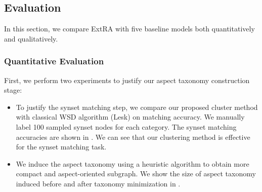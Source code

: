 \subsection{Evaluation}
\label{sec:endeval}
In this section, we compare ExtRA with five baseline models 
both quantitatively and qualitatively.

\subsubsection{Quantitative Evaluation}
\label{sec:quaneval}
First, we perform two experiments to justify our aspect taxonomy construction stage:
\begin{itemize}
	\item 
	To justify the synset matching step,
	we compare our proposed cluster method with classical WSD algorithm (Lesk) on matching accuracy.
	We manually label 100 sampled synset nodes for each category.
	The synset matching accuracies are shown in 
	.
	We can see that our clustering method is effective 
	for the synset matching task.
	\item 
	We induce the aspect taxonomy using a heuristic algorithm to obtain
	more compact and aspect-oriented subgraph. 
	We show the size of aspect taxonomy induced before and after 
taxonomy minimization in .
\end{itemize}



